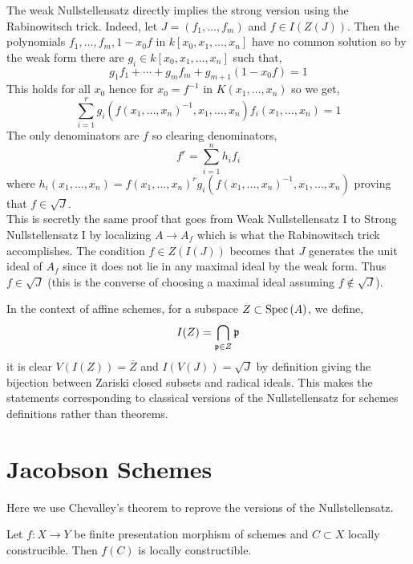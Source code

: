 \documentclass[12pt]{article}
\begin{document}
\begin{rmk}
The weak Nullstellensatz directly implies the strong version using the Rabinowitsch trick. Indeed, let $J = (f_1, \dots, f_m)$ and $f \in I(Z(J))$. Then the polynomials $f_1, \dots, f_m, 1 - x_0 f$ in $k[x_0, x_1, \dots, x_n]$ have no common solution so by the weak form there are $g_i \in k[x_0, x_1, \dots, x_n]$ such that,
\[ g_1 f_1 + \cdots + g_m f_m + g_{m+1}(1 - x_0 f) = 1 \]
This holds for all $x_0$ hence for $x_0 = f^{-1}$ in $K(x_1, \dots, x_n)$ so we get,
\[ \sum_{i = 1}^r g_i(f(x_1, \dots, x_n)^{-1}, x_1, \dots, x_n) f_i(x_1, \dots, x_n) = 1 \]
The only denominators are $f$ so clearing denominators,
\[ f^r = \sum_{i = 1}^n h_i f_i \]
where $h_i(x_1, \dots, x_n) = f(x_1, \dots, x_n)^r g_i(f(x_1, \dots, x_n)^{-1}, x_1, \dots, x_n)$ proving that $f \in \sqrt{J}$. 
\bigskip\\
This is secretly the same proof that goes from Weak Nullstellensatz I to Strong Nullstellensatz I by localizing $A \to A_f$ which is what the Rabinowitsch trick accomplishes. The condition $f \in Z(I(J))$ becomes that $J$ generates the unit ideal of $A_f$ since it does not lie in any maximal ideal by the weak form. Thus $f \in \sqrt{J}$ (this is the converse of choosing a maximal ideal assuming $f \notin \sqrt{J}$).
\end{rmk}

\begin{remark}
In the context of affine schemes, for a subspace $Z \subset \mathrm{Spec}\left( A \right)$, we define,
\[ I(Z) = \bigcap_{\mathfrak{p} \in Z} \mathfrak{p} \] 
it is clear $V(I(Z)) = \overline{Z}$ and $I(V(J)) = \sqrt{J}$ by definition giving the bijection between Zariski closed subsets and radical ideals. This makes the statements corresponding to classical versions of the Nullstellensatz for schemes definitions rather than theorems.
\end{remark}

\section{Jacobson Schemes}

\begin{rmk}
Here we use Chevalley's theorem to reprove the versions of the Nullstellensatz. 
\end{rmk}

\begin{theorem}[Chevalley]
Let $f : X \to Y$ be finite presentation morphism of schemes and $C \subset X$ locally construcible. Then $f(C)$ is locally constructible.
\end{theorem}
\end{document}
